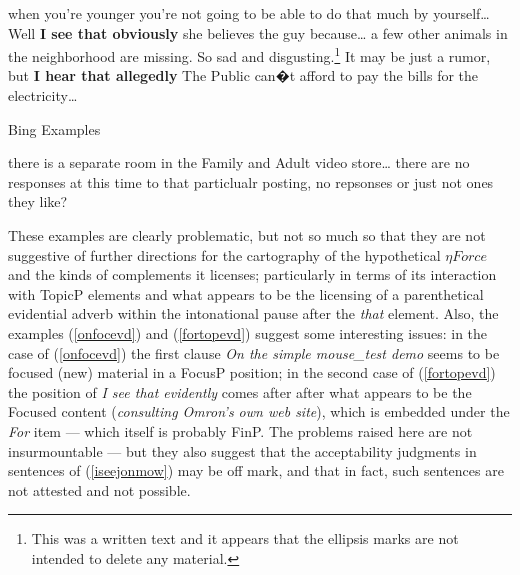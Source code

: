 \documentclass{article}
\begin{document}
\begin{exe}
\begin{xlist}
\begin{xlist}
\end{xlist}
 when you're younger you're not going to be able to do that much by yourself\ldots
\ex Well {\bf I see that obviously} she believes the guy because\ldots
{}a few other animals in the neighborhood are missing. So sad and disgusting.\footnote{This was a written text and it appears that the ellipsis marks are not intended to delete any material.}
\ex It may be just a rumor, but {\bf I hear that allegedly} The Public can�t afford to pay the bills for the electricity\ldots
\end{xlist}
\end{exe}


\begin{exe}
\ex Bing Examples
\begin{xlist}   
 there is a separate room in the Family and Adult video store\ldots
{} there are no responses at this time to that particlualr posting, no repsonses or just not ones they like? 
\end{xlist}  
\end{exe}

These examples are clearly problematic, but not so much so that they are not suggestive of further directions for the cartography of the hypothetical $\eta Force$ and the kinds of complements it licenses; particularly in terms of its interaction with TopicP elements and what appears to be the licensing of a parenthetical evidential adverb within the intonational pause after the {\sl that} element. Also, the examples (\ref{onfocevd}) and (\ref{fortopevd}) suggest some interesting issues: in the case of (\ref{onfocevd}) the first clause {\sl On the simple mouse\_test demo} seems to be focused (new) material in a FocusP position; in the second case of (\ref{fortopevd}) the position of {\sl I see that evidently} comes after after what appears to be the Focused content ({\sl consulting Omron's own web site}), which is embedded under the {\sl For} item --- which itself is probably FinP. The problems raised here are not insurmountable --- but they also suggest that the acceptability judgments in sentences of (\ref{iseejonmow}) may be off mark, and that in fact, such sentences are not attested and not possible.  
\end{document}
